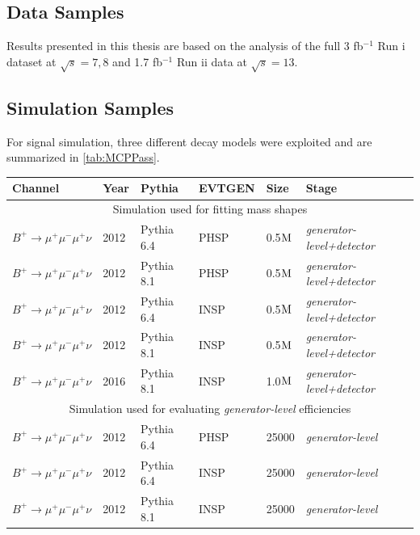 \subsection{Data Samples}

Results presented in this thesis are based on the analysis of the full 3 fb$^{-1}$ Run \Rn{1} dataset at $\sqrt{s}={7},{8}$ \tev and 1.7 fb$^{-1}$ Run \Rn{2} data at $\sqrt{s}=13$\tev.

\subsection{Simulation Samples}
\label{SimulationSamples}
For signal simulation, three different decay models were exploited and are summarized in \autoref{tab:MCPPass}.

\begin{table}[h!]
	\begin{center}
		\begin{tabular}{l l l l l l}

			Channel & Year & Pythia  & EVTGEN & Size & Stage \\ \hline
			 \multicolumn{6}{c}{Simulation used for fitting mass shapes} \\ \hline
			$B^{+} \rightarrow \mu^{+} \mu^{-} \mu^{+} \nu$ & 2012 & Pythia 6.4\cite{pythia6} & PHSP & 0.5$\rm{M}$ & \textit{generator-level+detector}\\
			$B^{+} \rightarrow \mu^{+} \mu^{-} \mu^{+} \nu$ & 2012 & Pythia 8.1\cite{pythia8} & PHSP & 0.5$\rm{M}$ & \textit{generator-level+detector}\\
			$B^{+} \rightarrow \mu^{+} \mu^{-} \mu^{+} \nu$ & 2012 & Pythia 6.4\cite{pythia6} & INSP & 0.5$\rm{M}$ & \textit{generator-level+detector}\\
			$B^{+} \rightarrow \mu^{+} \mu^{-} \mu^{+} \nu$ & 2012 & Pythia 8.1\cite{pythia8} & INSP & 0.5$\rm{M}$ & \textit{generator-level+detector}\\
			$B^{+} \rightarrow \mu^{+} \mu^{-} \mu^{+} \nu$ & 2016 & Pythia 8.1\cite{pythia8} & INSP & 1.0$\rm{M}$ & \textit{generator-level+detector}\\ \hline
			 \multicolumn{6}{c}{Simulation used for evaluating \textit{generator-level} efficiencies} \\ \hline
			$B^{+} \rightarrow \mu^{+} \mu^{-} \mu^{+} \nu$ & 2012 & Pythia 6.4\cite{pythia6} & PHSP & 25000 & \textit{generator-level}\\ %
			$B^{+} \rightarrow \mu^{+} \mu^{-} \mu^{+} \nu$ & 2012 & Pythia 6.4\cite{pythia6} & INSP & 25000 & \textit{generator-level}\\
			$B^{+} \rightarrow \mu^{+} \mu^{-} \mu^{+} \nu$ & 2012 & Pythia 8.1\cite{pythia8} & INSP & 25000 & \textit{generator-level}\\ \hline


\end{tabular}
\end{center}
\end{table}
